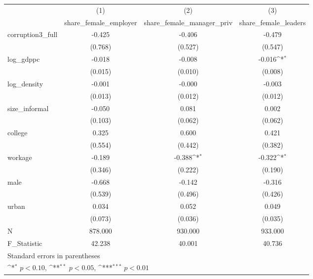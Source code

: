 {
\def\sym#1{\ifmmode^{#1}\else\(^{#1}\)\fi}
\begin{tabular}{l*{3}{c}}
\hline\hline
            &\multicolumn{1}{c}{(1)}&\multicolumn{1}{c}{(2)}&\multicolumn{1}{c}{(3)}\\
            &\multicolumn{1}{c}{share\_female\_employer}&\multicolumn{1}{c}{share\_female\_manager\_priv}&\multicolumn{1}{c}{share\_female\_leaders}\\
\hline
corruption3\_full&      -0.425         &      -0.406         &      -0.479         \\
            &     (0.768)         &     (0.527)         &     (0.547)         \\
[1em]
log\_gdppc   &      -0.018         &      -0.008         &      -0.016\sym{*}  \\
            &     (0.015)         &     (0.010)         &     (0.008)         \\
[1em]
log\_density &      -0.001         &      -0.000         &      -0.003         \\
            &     (0.013)         &     (0.012)         &     (0.012)         \\
[1em]
size\_informal&      -0.050         &       0.081         &       0.002         \\
            &     (0.103)         &     (0.062)         &     (0.062)         \\
[1em]
college     &       0.325         &       0.600         &       0.421         \\
            &     (0.554)         &     (0.442)         &     (0.382)         \\
[1em]
workage     &      -0.189         &      -0.388\sym{*}  &      -0.322\sym{*}  \\
            &     (0.346)         &     (0.222)         &     (0.190)         \\
[1em]
male        &      -0.668         &      -0.142         &      -0.316         \\
            &     (0.539)         &     (0.496)         &     (0.426)         \\
[1em]
urban       &       0.034         &       0.052         &       0.049         \\
            &     (0.073)         &     (0.036)         &     (0.035)         \\
\hline
N           &     878.000         &     930.000         &     933.000         \\
F\_Statistic &      42.238         &      40.001         &      40.736         \\
\hline\hline
\multicolumn{4}{l}{\footnotesize Standard errors in parentheses}\\
\multicolumn{4}{l}{\footnotesize \sym{*} \(p<0.10\), \sym{**} \(p<0.05\), \sym{***} \(p<0.01\)}\\
\end{tabular}
}
